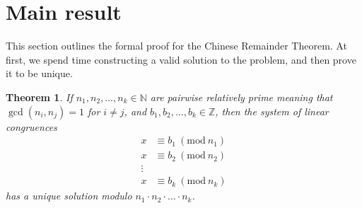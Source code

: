 \documentclass[12pt,a4paper,reqno,parskip=full]{amsart}
\numberwithin{equation}{section}
\theoremstyle{plain}
\newtheorem{theorem}[subsection]{Theorem}
\theoremstyle{definition}
\newcommand{\Mod}[1]{\ (\mathrm{mod}\ #1)}
\def\N{{\mathbb N}}
\def\Z{{\mathbb Z}}
\begin{document}

\section{Main result}

This section outlines the formal proof for the Chinese Remainder Theorem. At first, we spend time constructing a valid solution to the problem, and then prove it to be unique.

\begin{theorem}
	If $n_1, n_2, \ldots, n_k \in \N$ are pairwise relatively prime meaning that $\gcd(n_i, n_j) = 1$ for $i \ne j$, and $b_1, b_2, \ldots, b_k \in \Z$, then the system of linear congruences
	\begin{align*}
		x &\equiv b_1 \Mod{n_1}\\
		x &\equiv b_2 \Mod{n_2}\\
		\vdots\\
		x &\equiv b_k \Mod{n_k}
	\end{align*}
	has a unique solution modulo $n_1 \cdot n_2 \cdot \ldots \cdot n_k$.
\end{theorem}
\end{document}
